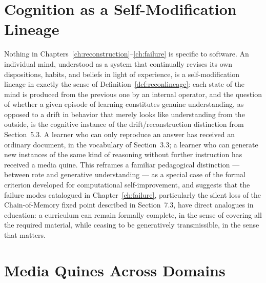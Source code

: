 \documentclass[11pt]{book}
\begin{document}
\section{Cognition as a Self-Modification Lineage}

Nothing in Chapters~\ref{ch:reconstruction}--\ref{ch:failure} is specific to software. An individual mind, understood as a system that continually revises its own dispositions, habits, and beliefs in light of experience, is a self-modification lineage in exactly the sense of Definition~\ref{def:reconlineage}: each state of the mind is produced from the previous one by an internal operator, and the question of whether a given episode of learning constitutes genuine understanding, as opposed to a drift in behavior that merely looks like understanding from the outside, is the cognitive instance of the drift/reconstruction distinction from Section~5.3. A learner who can only reproduce an answer has received an ordinary document, in the vocabulary of Section~3.3; a learner who can generate new instances of the same kind of reasoning without further instruction has received a media quine. This reframes a familiar pedagogical distinction --- between rote and generative understanding --- as a special case of the formal criterion developed for computational self-improvement, and suggests that the failure modes catalogued in Chapter~\ref{ch:failure}, particularly the silent loss of the Chain-of-Memory fixed point described in Section~7.3, have direct analogues in education: a curriculum can remain formally complete, in the sense of covering all the required material, while ceasing to be generatively transmissible, in the sense that matters.

\section{Media Quines Across Domains}
\end{document}
